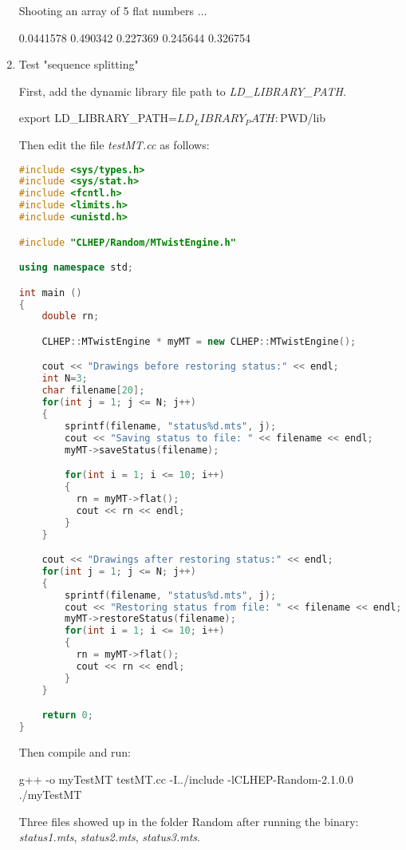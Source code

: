 \documentclass[a4paper, 12pt]{report}
\begin{document}
\begin{enumerate}
\begin{messageshell}
 Shooting an array of 5 flat numbers ...

 0.0441578 0.490342 0.227369 0.245644 0.326754
        \end{messageshell}


    \item Test "sequence splitting"

        First, add the dynamic library file path to \emph{LD\_LIBRARY\_PATH}.
        \begin{commandshell}
            export LD_LIBRARY_PATH=$LD_LIBRARY_PATH:$PWD/lib
        \end{commandshell}
        Then edit the file \emph{testMT.cc} as follows:
        \begin{lstlisting}[language=C++]
#include <sys/types.h>
#include <sys/stat.h>
#include <fcntl.h>
#include <limits.h>
#include <unistd.h>

#include "CLHEP/Random/MTwistEngine.h"

using namespace std;

int main ()
{
    double rn;

    CLHEP::MTwistEngine * myMT = new CLHEP::MTwistEngine();

    cout << "Drawings before restoring status:" << endl;
    int N=3;
    char filename[20];
    for(int j = 1; j <= N; j++)
    {
        sprintf(filename, "status%d.mts", j);
        cout << "Saving status to file: " << filename << endl;
        myMT->saveStatus(filename);

        for(int i = 1; i <= 10; i++)
        {
          rn = myMT->flat();
          cout << rn << endl;
        }
    }

    cout << "Drawings after restoring status:" << endl;
    for(int j = 1; j <= N; j++)
    {
        sprintf(filename, "status%d.mts", j);
        cout << "Restoring status from file: " << filename << endl;
        myMT->restoreStatus(filename);
        for(int i = 1; i <= 10; i++)
        {
          rn = myMT->flat();
          cout << rn << endl;
        }
    }

    return 0;
}
        \end{lstlisting}
        Then compile and run:
        \begin{commandshell}
            g++ -o myTestMT testMT.cc -I../include -lCLHEP-Random-2.1.0.0
            ./myTestMT
        \end{commandshell}
        Three files showed up in the folder Random after running the binary: \emph{status1.mts}, \emph{status2.mts}, \emph{status3.mts}.


\end{enumerate}
\end{document}
